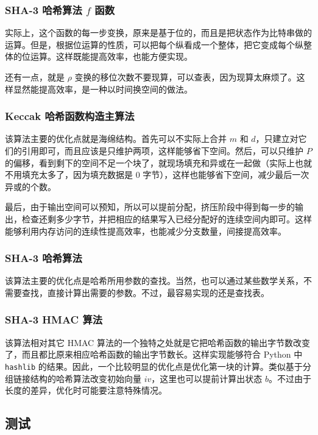 \documentclass[12pt,a4paper]{article}
\begin{document}
\subsubsection*{SHA-3 哈希算法 $ f $ 函数}

实际上，这个函数的每一步变换，原来是基于位的，而且是把状态作为比特串做的运算。但是，根据位运算的性质，可以把每个纵看成一个整体，把它变成每个纵整体的位运算。这样既能提高效率，也能方便实现。

还有一点，就是 $ \rho $ 变换的移位次数不要现算，可以查表，因为现算太麻烦了。这样显然能提高效率，是一种以时间换空间的做法。

\subsubsection*{Keccak 哈希函数构造主算法}

该算法主要的优化点就是海绵结构。首先可以不实际上合并 $ m $ 和 $ d $，只建立对它们的引用即可，而且应该是只维护两项，这样能够省下空间。然后，可以只维护 $ P $ 的偏移，看到剩下的空间不足一个块了，就现场填充和异或在一起做（实际上也就不用填充太多了，因为填充数据是 0 字节），这样也能够省下空间，减少最后一次异或的个数。

最后，由于输出空间可以预知，所以可以提前分配，挤压阶段中得到每一步的输出，检查还剩多少字节，并把相应的结果写入已经分配好的连续空间内即可。这样能够利用内存访问的连续性提高效率，也能减少分支数量，间接提高效率。

\subsubsection*{SHA-3 哈希算法}

该算法主要的优化点是哈希所用参数的查找。当然，也可以通过某些数学关系，不需要查找，直接计算出需要的参数。不过，最容易实现的还是查找表。

\subsubsection*{SHA-3 HMAC 算法}

该算法相对其它 HMAC 算法的一个独特之处就是它把哈希函数的输出字节数改变了，而且都比原来相应哈希函数的输出字节数长。这样实现能够符合 Python 中 \texttt{hashlib} 的结果。因此，一个比较明显的优化点是优化第一块的计算。类似基于分组链接结构的哈希算法改变初始向量 $ {iv} $，这里也可以提前计算出状态 $ b $。不过由于长度的差异，优化时可能要注意特殊情况。

\subsection*{测试}
\end{document}
